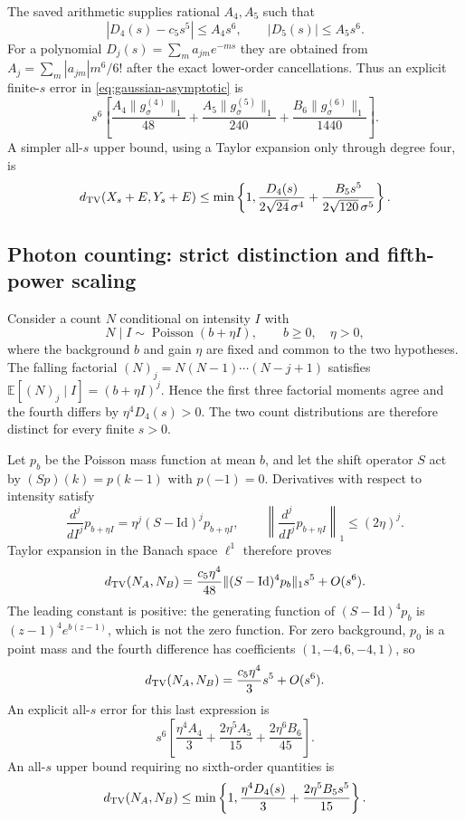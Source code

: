 The saved arithmetic supplies rational $A_4,A_5$ such that
\[
 |D_4(s)-c_5s^5|\le A_4s^6,
 \qquad |D_5(s)|\le A_5s^6.
\]
For a polynomial $D_j(s)=\sum_m a_{jm}e^{-ms}$ they are obtained from
$A_j=\sum_m|a_{jm}|m^6/6!$ after the exact lower-order cancellations.
Thus an explicit finite-$s$ error in \eqref{eq:gaussian-asymptotic} is
\begin{equation}\label{eq:gaussian-error}
 s^6\left[
 \frac{A_4\|g_\sigma^{(4)}\|_1}{48}
 +\frac{A_5\|g_\sigma^{(5)}\|_1}{240}
 +\frac{B_6\|g_\sigma^{(6)}\|_1}{1440}\right].
\end{equation}
A simpler all-$s$ upper bound, using a Taylor expansion only through
degree four, is
\[
 d_{\rm TV}(X_s+E,Y_s+E)
 \le\min\left\{1,
 \frac{D_4(s)}{2\sqrt{24}\,\sigma^4}
 +\frac{B_5s^5}{2\sqrt{120}\,\sigma^5}\right\}.
\]

\subsection{Photon counting: strict distinction and fifth-power scaling}

Consider a count $N$ conditional on intensity $I$ with
\[
 N\mid I\sim\operatorname{Poisson}(b+\eta I),
 \qquad b\ge0,\quad\eta>0,
\]
where the background $b$ and gain $\eta$ are fixed and common to the two
hypotheses. The falling factorial $(N)_j=N(N-1)\cdots(N-j+1)$ satisfies
$\mathbb E[(N)_j\mid I]=(b+\eta I)^j$. Hence the first three factorial
moments agree and the fourth differs by $\eta^4D_4(s)>0$. The two count
distributions are therefore distinct for every finite $s>0$.

Let $p_b$ be the Poisson mass function at mean $b$, and let the shift
operator $S$ act by $(Sp)(k)=p(k-1)$ with $p(-1)=0$. Derivatives with
respect to intensity satisfy
\[
 \frac{d^j}{dI^j}p_{b+\eta I}
 =\eta^j(S-\mathrm{Id})^j p_{b+\eta I},
 \qquad \left\|\frac{d^j}{dI^j}p_{b+\eta I}\right\|_1\le(2\eta)^j.
\]
Taylor expansion in the Banach space $\ell^1$ therefore proves
\begin{equation}\label{eq:poisson-asymptotic}
 d_{\rm TV}(N_A,N_B)
 =\frac{c_5\eta^4}{48}\|(S-\mathrm{Id})^4p_b\|_1s^5+O(s^6).
\end{equation}
The leading constant is positive: the generating function of
$(S-\mathrm{Id})^4p_b$ is $(z-1)^4e^{b(z-1)}$, which is not the zero
function. For zero background, $p_0$ is a point mass and the fourth
difference has coefficients $(1,-4,6,-4,1)$, so
\begin{equation}\label{eq:poisson-zero}
 d_{\rm TV}(N_A,N_B)=\frac{c_5\eta^4}{3}s^5+O(s^6).
\end{equation}
An explicit all-$s$ error for this last expression is
\[
 s^6\left[\frac{\eta^4A_4}{3}
 +\frac{2\eta^5A_5}{15}+\frac{2\eta^6B_6}{45}\right].
\]
An all-$s$ upper bound requiring no sixth-order quantities is
\[
 d_{\rm TV}(N_A,N_B)\le\min\left\{1,
 \frac{\eta^4D_4(s)}{3}+\frac{2\eta^5B_5s^5}{15}\right\}.
\]

